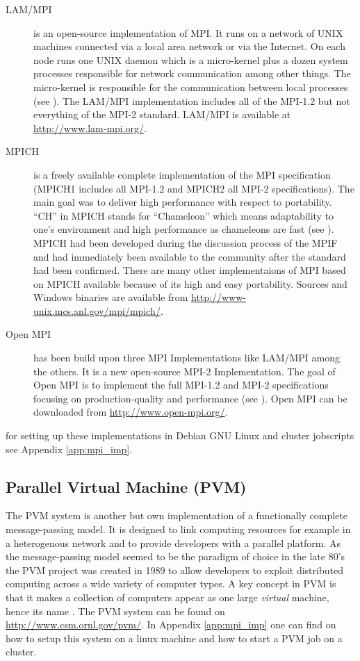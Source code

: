 \begin{description}
\item[LAM/MPI] is an open-source implementation of MPI. It runs on a
  network of UNIX machines connected via a local area network or via
  the Internet. On each node runs one UNIX daemon which is a
  micro-kernel plus a dozen system processes responsible for network
  communication among other things. The micro-kernel is
  responsible for the communication between local processes (see
  \cite{burns94lam}). The LAM/MPI implementation includes all of the
  MPI-1.2 but not everything of the MPI-2 standard. LAM/MPI is
  available at \url{http://www.lam-mpi.org/}.
\item[MPICH] is a freely available complete implementation of the MPI
  specification (MPICH1 includes all MPI-1.2 and MPICH2 all MPI-2
  specifications). The main goal was to deliver high performance with
  respect to portability. ``CH'' in MPICH stands for ``Chameleon''
  which means adaptability to one's environment and high performance
  as chameleons are fast (see \cite{gropp96mpich}). MPICH had been
  developed during the discussion process of the MPIF and had immediately been
  available to the community after the standard had been
  confirmed. There are many other implementaions of MPI based on MPICH
  available because of its high and easy portability. Sources and
  Windows binaries are available from
  \url{http://www-unix.mcs.anl.gov/mpi/mpich/}.
\item[Open MPI] has been build upon three MPI Implementations like
  LAM/MPI among the others. It is a new open-source MPI-2
  Implementation. The goal of Open MPI is to implement the full
  MPI-1.2 and MPI-2 specifications focusing on production-quality and
  performance (see \cite{gabriel04:_open_mpi}). Open MPI can be
  downloaded from  \url{http://www.open-mpi.org/}.
\end{description}

for setting up these implementations in Debian GNU Linux and cluster
jobscripts see Appendix \ref{app:mpi_imp}. 

\subsection{Parallel Virtual Machine (PVM)}
\label{sec:PVM}

The PVM system is another but own implementation of a functionally
complete message-passing model. It is designed to link computing
resources for example in a heterogenous network and to provide
developers with a parallel platform. As the message-passing model
seemed to be the paradigm of choice in the late 80's the PVM project
was created in 1989 to allow developers to exploit distributed
computing across a wide variety of computer types. A key concept in
PVM is that it makes a collection of computers appear as one large
\textit{virtual} machine, hence its name \cite{geist94pvm}. The PVM
system can be found on \url{http://www.csm.ornl.gov/pvm/}. In Appendix
\ref{app:mpi_imp} one can find on how to setup this system on a linux
machine and how to start a PVM job on a cluster.

